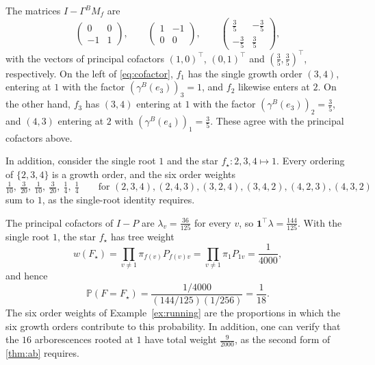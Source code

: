 \documentclass[onefignum,onetabnum,nohypdvips]{siamart250211}
\numberwithin{theorem}{section}
\numberwithin{equation}{section}
\newcommand{\pr}{\mathbb{P}}
\newcommand{\one}{\mathbf{1}}
\begin{document}
\begin{example}
The matrices
$I-\Gamma^BM_f$ are
\[
\begin{pmatrix}0&0\\-1&1\end{pmatrix},\qquad
\begin{pmatrix}1&-1\\0&0\end{pmatrix},\qquad
\begin{pmatrix}\tfrac35&-\tfrac35\\[2pt]-\tfrac35&\tfrac35\end{pmatrix},
\]
with the vectors of principal cofactors $(1,0)^\top$, $(0,1)^\top$ and $(\tfrac35,\tfrac35)^\top$,
respectively. On the left of \eqref{eq:cofactor}, $f_1$ has the single growth order
$(3,4)$, entering at $1$ with the factor $(\gamma^{B}(e_3))_3=1$, and
$f_2$ likewise enters at $2$. On the other hand, $f_3$ has $(3,4)$
entering at $1$ with the factor $(\gamma^{B}(e_3))_2=\tfrac35$, and
$(4,3)$ entering at $2$ with $(\gamma^{B}(e_4))_1=\tfrac35$. These agree
with the principal cofactors above. 

In addition, consider the single root $1$ and the star
$f_\star:2,3,4\mapsto1$. Every ordering of $\{2,3,4\}$ is a growth
order, and the six order weights
\[
\tfrac1{10},\ \tfrac3{20},\ \tfrac1{10},\ \tfrac3{20},\ \tfrac14,\ \tfrac14
\qquad\text{for }(2,3,4),(2,4,3),(3,2,4),(3,4,2),(4,2,3),(4,3,2)
\]
sum to $1$, as the single-root identity requires.
\end{example}

\begin{example}\label{ex:ab}
The principal cofactors of $I-P$ are $\lambda_v=\tfrac{36}{125}$ for
every $v$, so $\one^{\top}\lambda=\tfrac{144}{125}$. With the single
root $1$, the star $f_\star$ has tree weight
\[
w(F_\star)=\prod_{v\ne1}\pi_{f(v)}P_{f(v)v}=\prod_{v\ne1}\pi_1P_{1v}=\frac{1}{4000},
\]
and hence
\[
\pr(F=F_\star)=\frac{1/4000}{(144/125)(1/256)}=\frac1{18}.
\]
The six order weights of Example~\ref{ex:running} are the proportions in which the six
growth orders contribute to this probability. In addition, one can verify that the $16$
arborescences rooted at $1$ have total weight $\tfrac9{2000}$, as the
second form of \cref{thm:ab} requires.
\end{example}
\end{document}
